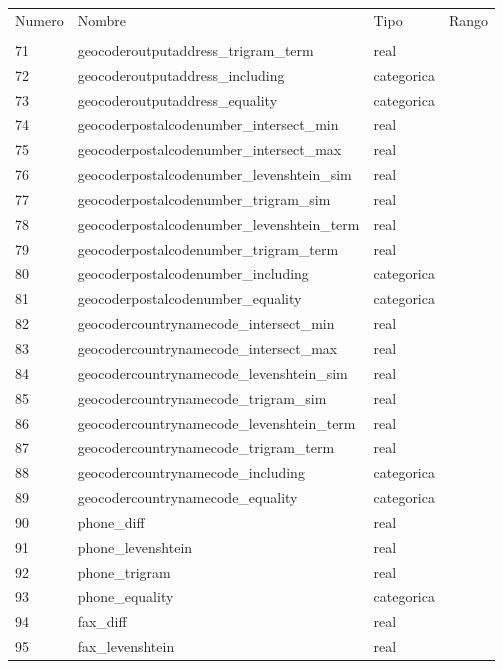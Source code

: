 \documentclass[journal]{IEEEtran}
\begin{document}
\begin{table}[ht!]
\centering
\begin{tabular}{l | l l l}
Numero & Nombre & Tipo & Rango \\
       &        &      &                 \\
\hline
71	& geocoderoutputaddress\_trigram\_term  &   real  \\
72	& geocoderoutputaddress\_including  &    categorica   \\
73	& geocoderoutputaddress\_equality  &    categorica   \\
74	& geocoderpostalcodenumber\_intersect\_min  &   real  \\
75	& geocoderpostalcodenumber\_intersect\_max  &   real  \\
76	& geocoderpostalcodenumber\_levenshtein\_sim  &   real  \\
77	& geocoderpostalcodenumber\_trigram\_sim  &   real  \\
78	& geocoderpostalcodenumber\_levenshtein\_term  &   real  \\
79	& geocoderpostalcodenumber\_trigram\_term  &   real  \\
80	& geocoderpostalcodenumber\_including  &    categorica   \\
81	& geocoderpostalcodenumber\_equality  &    categorica   \\
82	& geocodercountrynamecode\_intersect\_min  &   real  \\
83	& geocodercountrynamecode\_intersect\_max  &   real  \\
84	& geocodercountrynamecode\_levenshtein\_sim  &   real  \\
85	& geocodercountrynamecode\_trigram\_sim  &   real  \\
86	& geocodercountrynamecode\_levenshtein\_term  &   real  \\
87	& geocodercountrynamecode\_trigram\_term  &   real  \\
88	& geocodercountrynamecode\_including  &    categorica   \\
89	& geocodercountrynamecode\_equality  &    categorica   \\
90	& phone\_diff  &   real  \\
91	& phone\_levenshtein  &   real  \\
92	& phone\_trigram  &   real  \\
93	& phone\_equality  &    categorica   \\
94	& fax\_diff  &   real  \\
95	& fax\_levenshtein  &   real  \\

\end{tabular}
\end{table}
\end{document}

